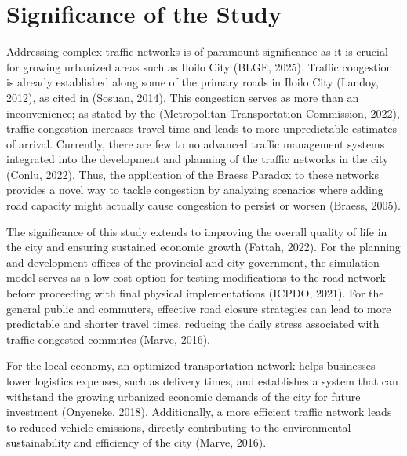 \section{Significance of the Study}
\label{sec:significance_of_the_study}

Addressing complex traffic networks is of paramount significance as it is crucial for growing urbanized areas such as Iloilo City (BLGF, 2025). Traffic congestion is already established along some of the primary roads in Iloilo City (Landoy, 2012), as cited in (Sosuan, 2014). This congestion serves as more than an inconvenience; as stated by the (Metropolitan Transportation Commission, 2022), traffic congestion increases travel time and leads to more unpredictable estimates of arrival. Currently, there are few to no advanced traffic management systems integrated into the development and planning of the traffic networks in the city (Conlu, 2022). Thus, the application of the Braess Paradox to these networks provides a novel way to tackle congestion by analyzing scenarios where adding road capacity might actually cause congestion to persist or worsen (Braess, 2005). 

The significance of this study extends to improving the overall quality of life in the city and ensuring sustained economic growth (Fattah, 2022). For the planning and development offices of the provincial and city government, the simulation model serves as a low-cost option for testing modifications to the road network before proceeding with final physical implementations (ICPDO, 2021). For the general public and commuters, effective road closure strategies can lead to more predictable and shorter travel times, reducing the daily stress associated with traffic-congested commutes (Marve, 2016).

For the local economy, an optimized transportation network helps businesses lower logistics expenses, such as delivery times, and establishes a system that can withstand the growing urbanized economic demands of the city for future investment (Onyeneke, 2018). Additionally, a more efficient traffic network leads to reduced vehicle emissions, directly contributing to the environmental sustainability and efficiency of the city  (Marve, 2016).